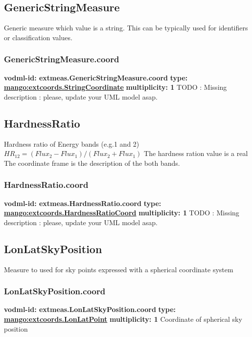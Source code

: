   \subsection{GenericStringMeasure}
  \label{sect:extmeas.GenericStringMeasure}
    Generic measure which value is a string. This can be typically used for identifiers or classification values.

    \subsubsection{GenericStringMeasure.coord}
      \textbf{vodml-id: extmeas.GenericStringMeasure.coord} \newline
      \textbf{type: \hyperref[sect:extcoords.StringCoordinate]{mango:extcoords.StringCoordinate}} \newline
      \textbf{multiplicity: 1} \newline 
      TODO : Missing description : please, update your UML model asap.

  \subsection{HardnessRatio}
  \label{sect:extmeas.HardnessRatio}
    Hardness ratio of Energy bands (e.g.1 and 2) $HR_{12} = (Flux_2 - Flux_1)/ (Flux_2 + Flux_1)$ The hardness ration value is a real The coordinate frame is the description of the both bands.

    \subsubsection{HardnessRatio.coord}
      \textbf{vodml-id: extmeas.HardnessRatio.coord} \newline
      \textbf{type: \hyperref[sect:extcoords.HardnessRatioCoord]{mango:extcoords.HardnessRatioCoord}} \newline
      \textbf{multiplicity: 1} \newline 
      TODO : Missing description : please, update your UML model asap.

  \subsection{LonLatSkyPosition}
  \label{sect:extmeas.LonLatSkyPosition}
    Measure to used for sky points expressed with a spherical coordinate system

    \subsubsection{LonLatSkyPosition.coord}
      \textbf{vodml-id: extmeas.LonLatSkyPosition.coord} \newline
      \textbf{type: \hyperref[sect:extcoords.LonLatPoint]{mango:extcoords.LonLatPoint}} \newline
      \textbf{multiplicity: 1} \newline 
      Coordinate of spherical sky position

